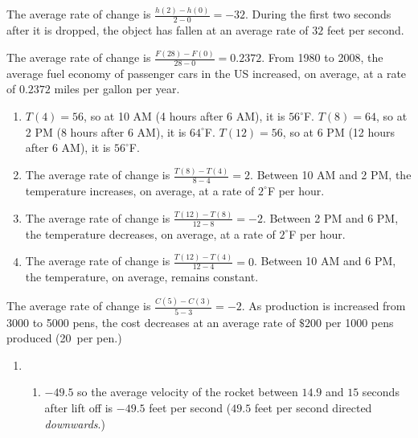 \begin{exenum}

\item The average rate of change is $\frac{h(2) - h(0)}{2-0}=-32$.  During the first two seconds after it is dropped, the object has fallen at an average rate of $32$ feet per second.

\item The average rate of change is $\frac{F(28) - F(0)}{28-0}=0.2372$.  From 1980 to 2008, the average fuel economy of passenger cars in the US increased, on average, at a rate of $0.2372$ miles per gallon per year.

\item
\begin{enumerate}

\item  $T(4) = 56$, so at 10 AM (4 hours after 6 AM), it is $56^{\circ}$F.  $T(8) = 64$, so at 2 PM (8 hours after 6 AM), it is $64^{\circ}$F.  $T(12) = 56$, so at 6 PM (12 hours after 6 AM), it is $56^{\circ}$F.

\item  The average rate of change is $\frac{T(8)-T(4)}{8-4}=2$.  Between 10 AM and 2 PM, the temperature increases, on average, at a rate of $2^{\circ}$F per hour.

\item  The average rate of change is $\frac{T(12)-T(8)}{12-8}=-2$.  Between 2 PM and 6 PM, the temperature decreases, on average, at a rate of $2^{\circ}$F per hour.

\item  The average rate of change is $\frac{T(12)-T(4)}{12-4}=0$.  Between 10 AM and 6 PM, the temperature, on average, remains constant.

\end{enumerate}

\item The average rate of change is $\frac{C(5)-C(3)}{5-3}=-2$.  As production is increased from 3000 to 5000 pens, the cost decreases at an average rate of  $\$200$ per 1000 pens produced (20\textcent \, per pen.)

\item

\begin{enumerate}

\item

\begin{enumerate}

\item  $-49.5$ so the average velocity of the rocket between $14.9$ and $15$ seconds after lift off is $-49.5$ feet per second ($49.5$ feet per second directed \textit{downwards}.)


\end{enumerate}
\end{enumerate}
\end{exenum}
